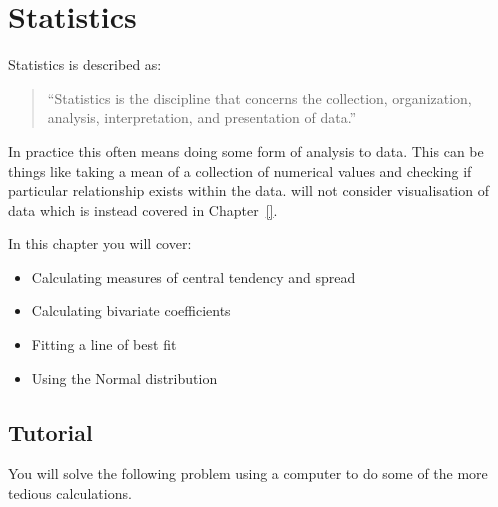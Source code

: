 \chapter{Statistics}
\label{\detokenize{tools-for-mathematics/08-statistics/introduction/main:statistics}}\label{\detokenize{tools-for-mathematics/08-statistics/introduction/main::doc}}

Statistics is described as:
\begin{quote}
``Statistics is the discipline that concerns the collection, organization,
analysis, interpretation, and presentation of data.''
\end{quote}


In practice this often means doing some form of analysis to data.
This can be things like taking a mean of a collection of numerical
values and checking if particular relationship exists within the data.
will not consider visualisation of data which is instead covered in
Chapter~\ref{}.



\begin{note}
In this chapter you will cover:
\begin{itemize}
\item 

Calculating measures of central tendency and spread

\item 

Calculating bivariate coefficients

\item 

Fitting a line of best fit

\item 

Using the Normal distribution

\end{itemize}
\end{note}





\section{Tutorial}
\label{\detokenize{tools-for-mathematics/08-statistics/tutorial/main:tutorial}}\label{\detokenize{tools-for-mathematics/08-statistics/tutorial/main::doc}}

You will solve the following problem using a computer to do some of the more
tedious calculations.

